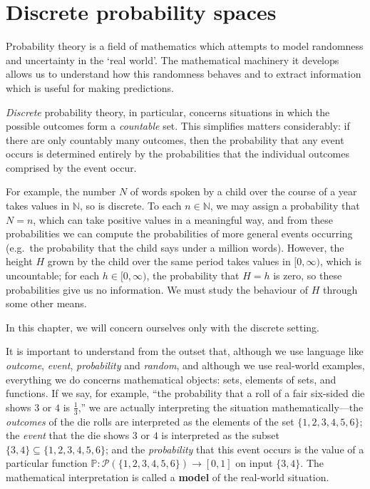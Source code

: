 \section{Discrete probability spaces}

Probability theory is a field of mathematics which attempts to model randomness and uncertainty in the `real world'. The mathematical machinery it develops allows us to understand how this randomness behaves and to extract information which is useful for making predictions.

\textit{Discrete} probability theory, in particular, concerns situations in which the possible outcomes form a \textit{countable} set. This simplifies matters considerably: if there are only countably many outcomes, then the probability that any event occurs is determined entirely by the probabilities that the individual outcomes comprised by the event occur.

For example, the number $N$ of words spoken by a child over the course of a year takes values in $\mathbb{N}$, so is discrete. To each $n \in \mathbb{N}$, we may assign a probability that $N=n$, which can take positive values in a meaningful way, and from these probabilities we can compute the probabilities of more general events occurring (e.g.\ the probability that the child says under a million words). However, the height $H$ grown by the child over the same period takes values in $[0,\infty)$, which is uncountable; for each $h \in [0,\infty)$, the probability that $H=h$ is zero, so these probabilities give us no information. We must study the behaviour of $H$ through some other means.

In this chapter, we will concern ourselves only with the discrete setting.

It is important to understand from the outset that, although we use language like \textit{outcome}, \textit{event}, \textit{probability} and \textit{random}, and although we use real-world examples, everything we do concerns mathematical objects: sets, elements of sets, and functions. If we say, for example, ``the probability that a roll of a fair six-sided die shows $3$ or $4$ is $\frac{1}{3}$,'' we are actually interpreting the situation mathematically---the \textit{outcomes} of the die rolls are interpreted as the elements of the set $\{ 1, 2, 3, 4, 5, 6 \}$; the \textit{event} that the die shows $3$ or $4$ is interpreted as the subset $\{ 3, 4 \} \subseteq \{ 1, 2, 3, 4, 5, 6 \}$; and the \textit{probability} that this event occurs is the value of a particular function $\mathbb{P} : \mathcal{P}(\{ 1, 2, 3, 4, 5, 6 \}) \to [0,1]$ on input $\{ 3, 4 \}$. The mathematical interpretation is called a \textbf{model} of the real-world situation.

